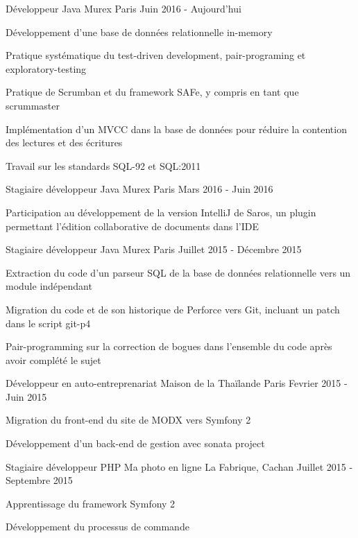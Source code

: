 
\begin{cventries}

\cventry
{Développeur Java}
{Murex}
{Paris}
{Juin 2016 - Aujourd'hui}
{
	\begin{cvitems}
	\item{Développement d'une base de données relationnelle in-memory}
	\item{Pratique systématique du test-driven development, pair-programing et exploratory-testing}
	\item{Pratique de Scrumban et du framework SAFe, y compris en tant que scrummaster}
	\item{Implémentation d'un MVCC dans la base de données pour réduire la contention des lectures et des écritures}
	\item{Travail sur les standards SQL-92 et SQL:2011}
	\end{cvitems}
}

\cventry
{Stagiaire développeur Java}
{Murex}
{Paris}
{Mars 2016 - Juin 2016}
{
	\begin{cvitems}
	\item{Participation au développement de la version IntelliJ de Saros, un plugin permettant l'édition collaborative de documents dans l'IDE}
	\end{cvitems}
}

\cventry
{Stagiaire développeur Java}
{Murex}
{Paris}
{Juillet 2015 - Décembre 2015}
{
	\begin{cvitems}
	\item{Extraction du code d'un parseur SQL de la base de données relationnelle vers un module indépendant}
	\item{Migration du code et de son historique de Perforce vers Git, incluant un patch dans le script git-p4}
	\item{Pair-programming sur la correction de bogues dans l'ensemble du code après avoir complété le sujet}
	\end{cvitems}
}

\cventry
{Développeur en auto-entreprenariat}
{Maison de la Thaïlande}
{Paris}
{Fevrier 2015 - Juin 2015}
{
	\begin{cvitems}
	\item{Migration du front-end du site de MODX vers Symfony 2}
	\item{Développement d'un back-end de gestion avec sonata project}
	\end{cvitems}
}

\cventry
{Stagiaire développeur PHP}
{Ma photo en ligne}
{La Fabrique, Cachan}
{Juillet 2015 - Septembre 2015}
{
	\begin{cvitems}
	\item{Apprentissage du framework Symfony 2}
	\item{Développement du processus de commande}
	\end{cvitems}
}

\end{cventries}
